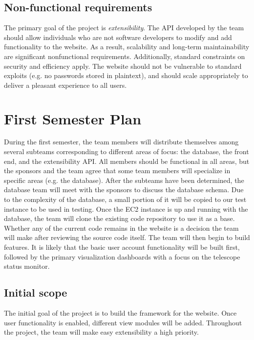 \documentclass[12pt]{article}
\begin{document}
\begin{spacing}{1.5}
\subsection{Non-functional requirements}
The primary goal of the project is \emph{extensibility}. The API developed by the team should allow individuals who are not software developers to modify and add functionality to the website. As a result, scalability and long-term maintainability are significant nonfunctional requirements. Additionally, standard constraints on security and efficiency apply. The website should not be vulnerable to standard exploits (e.g. no passwords stored in plaintext), and should scale appropriately to deliver a pleasant experience to all users.

\newpage

\section{First Semester Plan}
During the first semester, the team members will distribute themselves among several subteams corresponding to different areas of focus: the database, the front end, and the extensibility API. All members should be functional in all areas, but the sponsors and the team agree that some team members will specialize in specific areas (e.g. the database). After the subteams have been determined, the database team will meet with the sponsors to discuss the database schema. Due to the complexity of the database, a small portion of it will be copied to our test instance to be used in testing.
\newline \newline
Once the EC2 instance is up and running with the database, the team will clone the existing code repository to use it as a base. Whether any of the current code remains in the website is a decision the team will make after reviewing the source code itself. The team will then begin to build features. It is likely that the basic user account functionality will be built first, followed by the primary visualization dashboards with a focus on the telescope status monitor.

\subsection{Initial scope}
The initial goal of the project is to build the framework for the website. Once user functionality is enabled, different view modules will be added. Throughout the project, the team will make easy extensibility a high priority.


\end{spacing}
\end{document}
